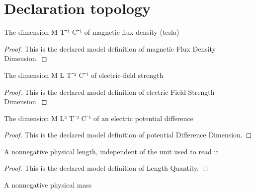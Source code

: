 \section{Declaration topology}
\begin{definition}
  \label{def:physics:phyx-mini-0634:phyxminiproblems-problemphyxmini0634-magneticfluxdensitydimension}
  The dimension M T⁻¹ C⁻¹ of magnetic flux density (tesla)
\end{definition}
\begin{proof}
  This is the declared model definition of magnetic Flux Density Dimension.
\end{proof}
\begin{definition}
  \label{def:physics:phyx-mini-0634:phyxminiproblems-problemphyxmini0634-electricfieldstrengthdimension}
  The dimension M L T⁻² C⁻¹ of electric-field strength
\end{definition}
\begin{proof}
  This is the declared model definition of electric Field Strength Dimension.
\end{proof}
\begin{definition}
  \label{def:physics:phyx-mini-0634:phyxminiproblems-problemphyxmini0634-potentialdifferencedimension}
  The dimension M L² T⁻² C⁻¹ of an electric potential difference
\end{definition}
\begin{proof}
  This is the declared model definition of potential Difference Dimension.
\end{proof}
\begin{definition}
  \label{def:physics:phyx-mini-0634:phyxminiproblems-problemphyxmini0634-lengthquantity}
  A nonnegative physical length, independent of the unit used to read it
\end{definition}
\begin{proof}
  This is the declared model definition of Length Quantity.
\end{proof}
\begin{definition}
  \label{def:physics:phyx-mini-0634:phyxminiproblems-problemphyxmini0634-massquantity}
  A nonnegative physical mass
\end{definition}
